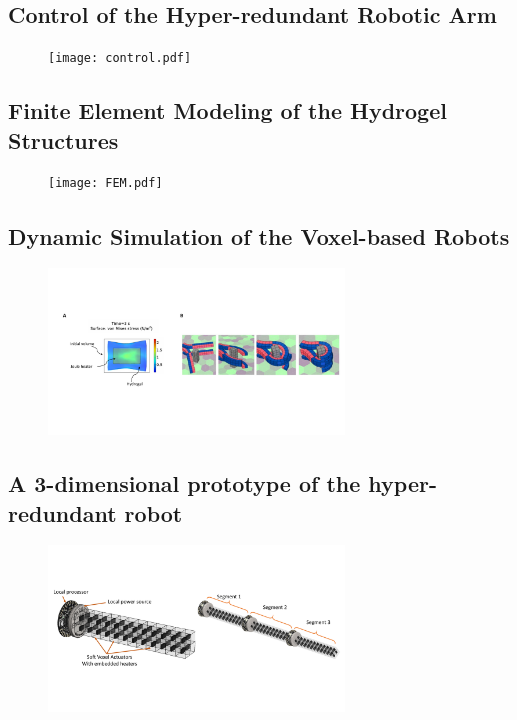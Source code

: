 \subsection{Control of the Hyper-redundant Robotic Arm}
\begin{figure}[!t]
\centering
\texttt{[image: control.pdf]}
    \caption[]{}
    \label{fig:control}
\end{figure}

\subsection{Finite Element Modeling of the Hydrogel Structures}
\begin{figure}[!t]
\centering
\texttt{[image: FEM.pdf]}
    \caption[]{}
    \label{fig:FEM}
\end{figure}

\subsection{Dynamic Simulation of the Voxel-based Robots}
\begin{figure}[!t]
\centering
\includegraphics[width=0.7\textwidth]{voxcad.pdf}
    \caption[]{}
    \label{fig:voxcad}
\end{figure}

\subsection{A 3-dimensional prototype of the hyper-redundant robot}
\begin{figure}[!t]
\centering
\includegraphics[width=0.7\textwidth]{3Darm.pdf}
    \caption[]{}
    \label{fig:3Darm}
\end{figure}

